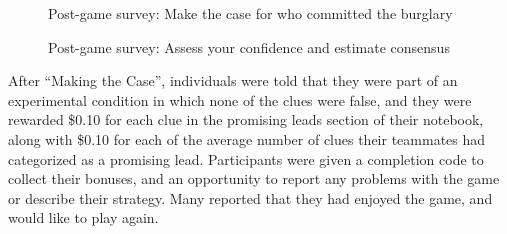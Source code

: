 \documentclass{article}
\begin{document}
\begin{figure}[h!]
\centering
{}
\caption{Post-game survey: Make the case for who committed the burglary}
\label{fig:make_the_case}
\end{figure}

\begin{figure}[h!]
\centering
{}
\caption{Post-game survey: Assess your confidence and estimate consensus}
\label{fig:confidence}
\end{figure}

After “Making the Case”, individuals were told that they were part of an experimental condition in which none of the clues were false, and they were rewarded \$0.10 for each clue in the promising leads section of their notebook, along with \$0.10 for each of the average number of clues their teammates had categorized as a promising lead. Participants were given a completion code to collect their bonuses, and an opportunity to report any problems with the game or describe their strategy. Many reported that they had enjoyed the game, and would like to play again.

\end{document}
